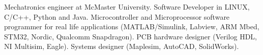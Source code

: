 
\begin{cvparagraph}

Mechatronics engineer at McMaster University.  Software Developer in LINUX, C/C++, Python and Java.  Microcontroller and Microprocessor software programmer for real life applications (MATLAB/Simulink, Labview, ARM Mbed, STM32, Nordic, Qualcomm Snapdragon).  PCB hardware designer (Verilog HDL, NI Multisim, Eagle).  Systems designer (Maplesim, AutoCAD, SolidWorks).
\end{cvparagraph}
